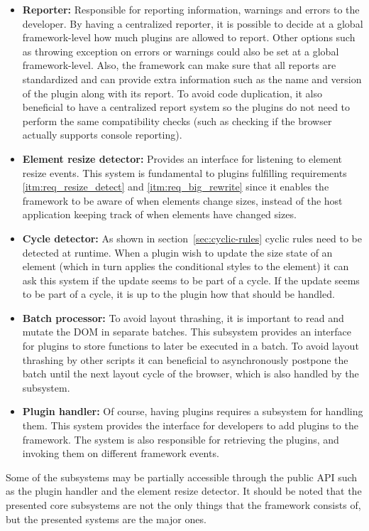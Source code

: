 \documentclass[a4paper,11pt]{kth-mag}
\newcommand\abbr[2][]{\uppercase{#2}\ifthenelse{\equal{#1}{}}%
                     {}{#1}}
\begin{document}
        \begin{itemize}
          \item \textbf{Reporter:}
            Responsible for reporting information, warnings and errors to the developer.
            By having a centralized reporter, it is possible to decide at a global framework-level how much plugins are allowed to report.
            Other options such as throwing exception on errors or warnings could also be set at a global framework-level.
            Also, the framework can make sure that all reports are standardized and can provide extra information such as the name and version of the plugin along with its report.
            To avoid code duplication, it also beneficial to have a centralized report system so the plugins do not need to perform the same compatibility checks (such as checking if the browser actually supports console reporting).
          \item \textbf{Element resize detector:}
            Provides an interface for listening to element resize events.
            This system is fundamental to plugins fulfilling requirements \ref{itm:req_resize_detect} and \ref{itm:req_big_rewrite} since it enables the framework to be aware of when elements change sizes, instead of the host application keeping track of when elements have changed sizes.
          \item \textbf{Cycle detector:}
            As shown in section~\ref{sec:cyclic-rules} cyclic rules need to be detected at runtime.
            When a plugin wish to update the size state of an element (which in turn applies the conditional styles to the element) it can ask this system if the update seems to be part of a cycle.
            If the update seems to be part of a cycle, it is up to the plugin how that should be handled.
          \item \textbf{Batch processor:}
            To avoid layout thrashing, it is important to read and mutate the \abbr{dom} in separate batches.
            This subsystem provides an interface for plugins to store functions to later be executed in a batch.
            To avoid layout thrashing by other scripts it can beneficial to asynchronously postpone the batch until the next layout cycle of the browser, which is also handled by the subsystem.
          \item \textbf{Plugin handler:}
            Of course, having plugins requires a subsystem for handling them.
            This system provides the interface for developers to add plugins to the framework.
            The system is also responsible for retrieving the plugins, and invoking them on different framework events.
        \end{itemize}
        Some of the subsystems may be partially accessible through the public \abbr{api} such as the plugin handler and the element resize detector.
        It should be noted that the presented core subsystems are not the only things that the framework consists of, but the presented systems are the major ones.
\end{document}
